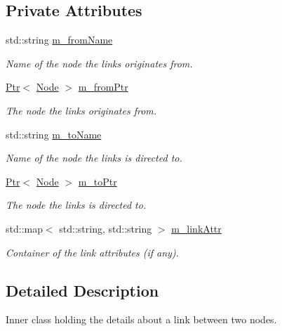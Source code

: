 \subsection*{Private Attributes}
\begin{DoxyCompactItemize}
\item 
std\+::string \hyperlink{classns3_1_1TopologyReader_1_1Link_a9c317022c868f9aac4bb7bbd7fdca083}{m\+\_\+from\+Name}
\begin{DoxyCompactList}\small\item\em Name of the node the links originates from. \end{DoxyCompactList}\item 
\hyperlink{classns3_1_1Ptr}{Ptr}$<$ \hyperlink{classns3_1_1Node}{Node} $>$ \hyperlink{classns3_1_1TopologyReader_1_1Link_a2c5203e648f0685f196c8c6b3fd4091e}{m\+\_\+from\+Ptr}
\begin{DoxyCompactList}\small\item\em The node the links originates from. \end{DoxyCompactList}\item 
std\+::string \hyperlink{classns3_1_1TopologyReader_1_1Link_aa2bdf5d42515ef48cfe10d1ff84c3017}{m\+\_\+to\+Name}
\begin{DoxyCompactList}\small\item\em Name of the node the links is directed to. \end{DoxyCompactList}\item 
\hyperlink{classns3_1_1Ptr}{Ptr}$<$ \hyperlink{classns3_1_1Node}{Node} $>$ \hyperlink{classns3_1_1TopologyReader_1_1Link_aaa958216fb5b999439b477dd03608b2a}{m\+\_\+to\+Ptr}
\begin{DoxyCompactList}\small\item\em The node the links is directed to. \end{DoxyCompactList}\item 
std\+::map$<$ std\+::string, std\+::string $>$ \hyperlink{classns3_1_1TopologyReader_1_1Link_a2b325284263ae796ac5d307f6e449e47}{m\+\_\+link\+Attr}
\begin{DoxyCompactList}\small\item\em Container of the link attributes (if any). \end{DoxyCompactList}\end{DoxyCompactItemize}


\subsection{Detailed Description}
Inner class holding the details about a link between two nodes. 


